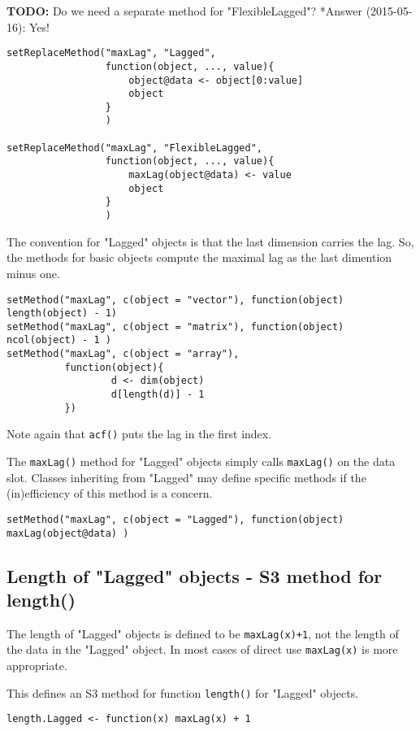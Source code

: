 \documentclass[11pt,a4paper]{article}
\begin{document}
\textbf{TODO:} Do we need a separate method for "FlexibleLagged"?
*Answer (2015-05-16): Yes!
\begin{verbatim}
setReplaceMethod("maxLag", "Lagged",
                 function(object, ..., value){
                     object@data <- object[0:value]
                     object
                 }
                 )

setReplaceMethod("maxLag", "FlexibleLagged",
                 function(object, ..., value){
                     maxLag(object@data) <- value
                     object
                 }
                 )
\end{verbatim}

The convention for "Lagged" objects is that the last dimension carries the lag.  So, the
methods for basic objects compute the maximal lag as the last dimention minus one.
\begin{verbatim}
setMethod("maxLag", c(object = "vector"), function(object) length(object) - 1)
setMethod("maxLag", c(object = "matrix"), function(object) ncol(object) - 1 )
setMethod("maxLag", c(object = "array"),
          function(object){
                  d <- dim(object)
                  d[length(d)] - 1
          })
\end{verbatim}
Note again that \texttt{acf()} puts the lag in the first index.

The \texttt{maxLag()} method for "Lagged" objects simply calls \texttt{maxLag()} on the data slot. Classes
inheriting from "Lagged" may define specific methods if the (in)efficiency of this method is
a concern.
\begin{verbatim}
setMethod("maxLag", c(object = "Lagged"), function(object) maxLag(object@data) )
\end{verbatim}


\subsection{Length of "Lagged" objects - S3 method for length()}
\label{sec:orgef70436}

The length of "Lagged" objects is defined to be \texttt{maxLag(x)+1}, not the length of the data in
the "Lagged" object. In most cases of direct use \texttt{maxLag(x)} is more appropriate.

This defines an S3 method for function \texttt{length()} for "Lagged" objects.
\begin{verbatim}
length.Lagged <- function(x) maxLag(x) + 1
\end{verbatim}
\end{document}
